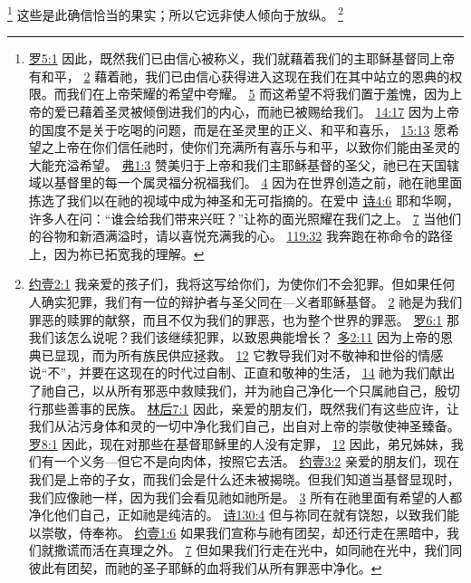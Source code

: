\documentclass[12pt, a4paper, oneside]{ctexart}
\begin{document}
	\footnote {
		\href{https://biblehub.com/romans/5-1.htm}{罗5:1} 因此，既然我们已由信心被称义，我们就藉着我们的主耶稣基督同上帝有和平，
		\href{https://biblehub.com/romans/5-2.htm}{2} 藉着祂，我们已由信心获得进入这现在我们在其中站立的恩典的权限。而我们在上帝荣耀的希望中夸耀。
		\href{https://biblehub.com/romans/5-5.htm}{5} 而这希望不将我们置于羞愧，因为上帝的爱已藉着圣灵被倾倒进我们的内心，而祂已被赐给我们。
		\href{https://biblehub.com/romans/14-17.htm}{14:17} 因为上帝的国度不是关于吃喝的问题，而是在圣灵里的正义、和平和喜乐，
		\href{https://biblehub.com/romans/15-13.htm}{15:13} 愿希望之上帝在你们信任祂时，使你们充满所有喜乐与和平，以致你们能由圣灵的大能充溢希望。
		\href{https://biblehub.com/ephesians/1-3.htm}{弗1:3} 赞美归于上帝和我们主耶稣基督的圣父，祂已在天国辖域以基督里的每一个属灵福分祝福我们。
		\href{https://biblehub.com/ephesians/1-4.htm}{4} 因为在世界创造之前，祂在祂里面拣选了我们以在祂的视域中成为神圣和无可指摘的。在爱中
		\href{https://biblehub.com/psalms/4-6.htm}{诗4:6} 耶和华啊，许多人在问：“谁会给我们带来兴旺？”让祢的面光照耀在我们之上。
		\href{https://biblehub.com/psalms/4-7.htm}{7} 当他们的谷物和新酒满溢时，请以喜悦充满我的心。
		\href{https://biblehub.com/psalms/119-32.htm}{119:32} 我奔跑在祢命令的路径上，因为祢已拓宽我的理解。
	}
	这些是此确信恰当的果实；所以它远非使人倾向于放纵。
	\footnote {
		\href{https://biblehub.com/1_john/2-1.htm}{约壹2:1} 我亲爱的孩子们，我将这写给你们，为使你们不会犯罪。但如果任何人确实犯罪，我们有一位的辩护者与圣父同在---义者耶稣基督。
		\href{https://biblehub.com/1_john/2-2.htm}{2} 祂是为我们罪恶的赎罪的献祭，而且不仅为我们的罪恶，也为整个世界的罪恶。
		\href{https://biblehub.com/romans/6-1.htm}{罗6:1} 那我们该怎么说呢？我们该继续犯罪，以致恩典能增长？
        \href{https://biblehub.com/titus/2-11.htm}{多2:11} 因为上帝的恩典已显现，而为所有族民供应拯救。
		\href{https://biblehub.com/titus/2-12.htm}{12} 它教导我们对不敬神和世俗的情感说“不”，并要在这现在的时代过自制、正直和敬神的生活，
		\href{https://biblehub.com/titus/2-14.htm}{14} 祂为我们献出了祂自己，以从所有邪恶中救赎我们，并为祂自己净化一个只属祂自己，殷切行那些善事的民族。
		\href{https://biblehub.com/2_corinthians/7-1.htm}{林后7:1} 因此，亲爱的朋友们，既然我们有这些应许，让我们从沾污身体和灵的一切中净化我们自己，出自对上帝的崇敬使神圣臻备。
		\href{https://biblehub.com/romans/8-1.htm}{罗8:1} 因此，现在对那些在基督耶稣里的人没有定罪，
		\href{https://biblehub.com/romans/8-12.htm}{12} 因此，弟兄姊妹，我们有一个义务---但它不是向肉体，按照它去活。
		\href{https://biblehub.com/1_john/3-2.htm}{约壹3:2} 亲爱的朋友们，现在我们是上帝的子女，而我们会是什么还未被揭晓。但我们知道当基督显现时，我们应像祂一样，因为我们会看见祂如祂所是。
		\href{https://biblehub.com/1_john/3-3.htm}{3} 所有在祂里面有希望的人都净化他们自己，正如祂是纯洁的。
		\href{https://biblehub.com/psalms/130-4.htm}{诗130:4} 但与祢同在就有饶恕，以致我们能以崇敬，侍奉祢。
        \href{https://biblehub.com/1_john/1-6.htm}{约壹1:6} 如果我们宣称与祂有团契，却还行走在黑暗中，我们就撒谎而活在真理之外。
		\href{https://biblehub.com/1_john/1-7.htm}{7} 但如果我们行走在光中，如同祂在光中，我们同彼此有团契，而祂的圣子耶稣的血将我们从所有罪恶中净化。
	}
\end{document}
